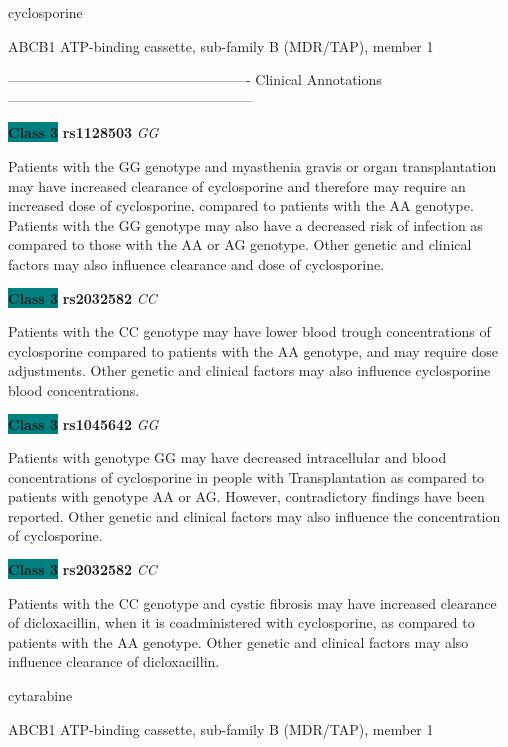 \documentclass{resume} %
\begin{document}
\begin{rSection}{ cyclosporine }
\begin{rSubsection}{ ABCB1 }{ ATP-binding cassette, sub-family B (MDR/TAP), member 1 }{}{}
\item[] ---------------------------------------------------- Clinical Annotations -----------------------------------------------------\newline
\item \textbf{\colorbox{teal} {Class 3}} \textbf{ rs1128503 } \textit{ GG }
\item[] Patients with the GG genotype and myasthenia gravis or organ transplantation may have increased clearance of cyclosporine and therefore may require an increased dose of cyclosporine, compared to patients with the AA genotype. Patients with the GG genotype may also have a decreased risk of infection as compared to those with the AA or AG genotype. Other genetic and clinical factors may also influence clearance and dose of cyclosporine.\item \textbf{\colorbox{teal} {Class 3}} \textbf{ rs2032582 } \textit{ CC }
\item[] Patients with the CC genotype may have lower blood trough concentrations of cyclosporine compared to patients with the AA genotype, and may require dose adjustments. Other genetic and clinical factors may also influence cyclosporine blood concentrations.\item \textbf{\colorbox{teal} {Class 3}} \textbf{ rs1045642 } \textit{ GG }
\item[] Patients with genotype GG may have decreased intracellular and blood concentrations of cyclosporine in people with Transplantation as compared to patients with genotype AA or AG. However, contradictory findings have been reported. Other genetic and clinical factors may also influence the concentration of cyclosporine.\item \textbf{\colorbox{teal} {Class 3}} \textbf{ rs2032582 } \textit{ CC }
\item[] Patients with the CC genotype and cystic fibrosis may have increased clearance of dicloxacillin, when it is coadministered with cyclosporine, as compared to patients with the AA genotype. Other genetic and clinical factors may also influence clearance of dicloxacillin.
\end{rSubsection}

\end{rSection}\begin{rSection}{ cytarabine }
\item[]

\begin{rSubsection}{ ABCB1 }{ ATP-binding cassette, sub-family B (MDR/TAP), member 1 }{}{}
\item[]


\end{rSubsection}
\end{rSection}
\end{document}

